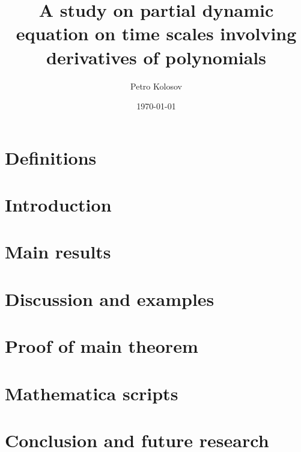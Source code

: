 \documentclass[12pt,letterpaper,oneside,reqno]{amsart}
\title[A study on partial dyn. eq. on time scales involv. derivatives of polynomials]
{A study on partial dynamic equation on time scales involving derivatives of polynomials}
\author[Petro Kolosov]{Petro Kolosov}
\date{\today}
\numberwithin{equation}{section}
\begin{document}
    \begin{abstract}
        
    \end{abstract}

    \maketitle

    \tableofcontents


    \section{Definitions} \label{sec:definitions}
    


    \section{Introduction} \label{sec:introduction}
    


    \section{Main results} \label{sec:main_results}
    


    \section{Discussion and examples} \label{sec:discussion_and_examples}
    


    \section{Proof of main theorem} \label{sec:proof_main_theorem}
    


    \section{Mathematica scripts} \label{sec:mathematica_scripts}
    


    \section{Conclusion and future research} \label{sec:conclusion}
    

    
    
\end{document}
